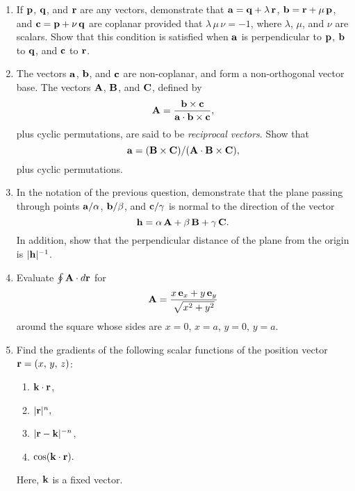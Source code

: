 {\begin{enumerate}
\item If ${\bf p}$, ${\bf q}$, and ${\bf r}$ are any vectors, demonstrate that 
${\bf a}={\bf q} + \lambda\,{\bf r}$, ${\bf b} = {\bf r}+\mu\,{\bf p}$,
and ${\bf c} = {\bf p} + \nu\,{\bf q}$ are coplanar provided that
$\lambda\,\mu\,\nu=-1$, where $\lambda$, $\mu$, and $\nu$ are scalars.
Show that this condition is satisfied when ${\bf a}$ is perpendicular to ${\bf p}$, ${\bf b}$ to ${\bf q}$, and ${\bf c}$ to ${\bf r}$.

\item The vectors ${\bf a}$, ${\bf b}$, and ${\bf c}$ are non-coplanar, and
form a non-orthogonal vector base. The vectors ${\bf A}$, ${\bf B}$,
and ${\bf C}$, defined by
$$
{\bf A} = \frac{{\bf b}\times {\bf c}}{{\bf a}\cdot{\bf b}\times {\bf c}},
$$
plus cyclic permutations, are said to be {\em reciprocal vectors}. Show that
 $$
 {\bf a} = ({\bf B}\times {\bf C})/({\bf A}\cdot{\bf B}\times {\bf C}),
 $$
plus cyclic permutations.

\item In the notation of the previous question, demonstrate that the plane passing
through points ${\bf a}/\alpha$, ${\bf b}/\beta$, and ${\bf c}/\gamma$
is normal to the direction of the vector
$$
{\bf h} = \alpha\,{\bf A} + \beta\,{\bf B} + \gamma\,{\bf C}.
$$
In addition, show that the perpendicular distance of the plane from the
origin is $|{\bf h}|^{-1}$.

\item Evaluate $\oint {\bf A}\cdot d{\bf r}$ for
$$
{\bf A} = \frac{x\,{\bf e}_x + y\,{\bf e}_y}{\sqrt{x^2 + y^2}}
$$
around the square whose sides are $x=0$, $x=a$, $y=0$, $y=a$. 

\item Find the gradients of the following scalar functions of the position vector ${\bf r}=(x,\,y,\,z)$:
\begin{enumerate}
\item ${\bf k}\cdot{\bf r}$,
\item $|{\bf r}|^n,$
\item $|{\bf r}-{\bf k}|^{-n}$,
\item $\cos({\bf k}\cdot {\bf r}).$
\end{enumerate}
Here, ${\bf k}$ is a fixed vector.

\end{enumerate}
\renewcommand{\theenumi}{\arabic{enumi}}}
